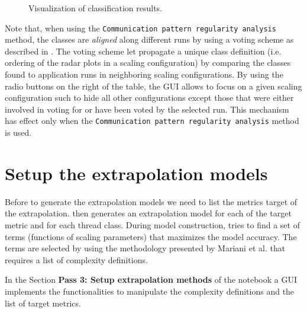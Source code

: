 \documentclass[a4paper, 10pt]{article}
\begin{document}
\begin{figure}[h!]
\centering
{}
\caption{Visualization of classification results.}
\label{fig:clusteringVisualization}
\end{figure}

Note that, when using the \texttt{Communication pattern regularity analysis} method, the classes
are \textit{aligned} along different runs by using a voting scheme as described in \cite{mariani201Xclassification}.
The voting scheme let propagate a unique class definition (i.e. ordering of the radar plots in a scaling configuration)
by comparing the classes found to application runs in neighboring scaling configurations.
By using the radio buttons on the right of the table, the GUI allows to focus on a given scaling configuration such to hide
all other configurations except those that were either involved in voting for or have been voted by the selected run.
This mechanism has effect only when the \texttt{Communication pattern regularity analysis} method is used.



\section{Setup the extrapolation models}
\label{sec:setup}

Before to generate the extrapolation models we need to list the metrics target of the extrapolation.
\ex then generates an extrapolation model for each of the target metric and for each thread class.
During model construction, \ex tries to find a set of terms (functions of scaling parameters)
that maximizes the model accuracy. The terms are selected by using the methodology presented by Mariani et al.
\cite{mariani2016ijpp} that requires a list of complexity definitions.

In the Section \textbf{Pass 3: Setup extrapolation methods} of the \ex notebook a GUI implements
the functionalities to manipulate the complexity definitions and the list of target metrics.
\end{document}
